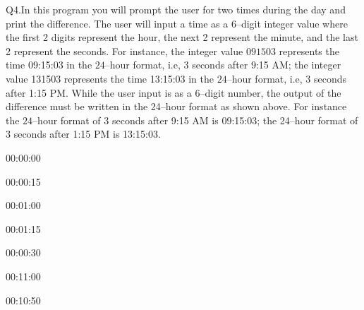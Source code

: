 Q4.In this program you will prompt the user for two times during the day and print the difference. The
user will input a time as a $6$--digit integer value where the first 2 digits represent the hour, the next 2
represent the minute, and the last 2 represent the seconds. For instance, the integer value $091503$
represents the time 09:15:03 in the $24$--hour format, i.e, 3 seconds after 9:15 AM; the integer value
131503 represents the time 13:15:03 in the $24$--hour format, i.e, 3 seconds after 1:15 PM. While the
user input is as a 6--digit number, the output of the difference must be written in the 24--hour format as
shown above. For instance the $24$--hour format of $3$ seconds after 9:15 AM is 09:15:03; the 24--hour
format of 3 seconds after 1:15 PM is 13:15:03.

\resett
\nextt
\begin{console}[commandchars=\\\{\}]
00:00:00
\end{console}

\nextt
\begin{console}[commandchars=\\\{\}]
00:00:15
\end{console}

\nextt
\begin{console}[commandchars=\\\{\}]
00:01:00
\end{console}

\nextt
\begin{console}[commandchars=\\\{\}]
00:01:15
\end{console}

\nextt
\begin{console}[commandchars=\\\{\}]
00:00:30
\end{console}

\nextt
\begin{console}[commandchars=\\\{\}]
00:11:00
\end{console}

\nextt
\begin{console}[commandchars=\\\{\}]
00:10:50
\end{console}

